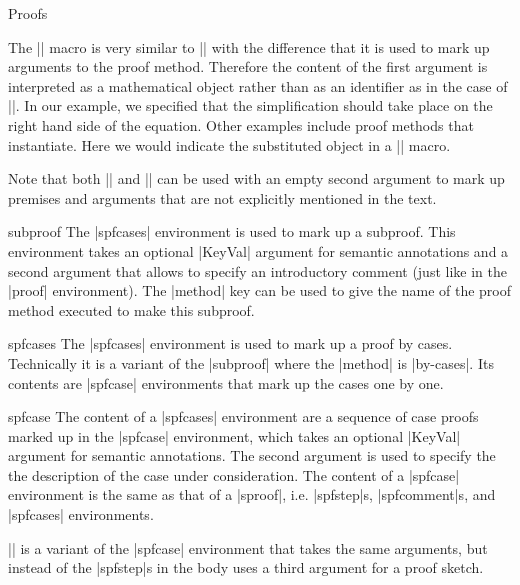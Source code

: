 \begin{sfragment}{Proofs}
\begin{function}{\justarg}
  The |\justarg| macro is very similar to |\premise| with the difference that it is used
  to mark up arguments to the proof method. Therefore the content of the first argument
  is interpreted as a mathematical object rather than as an identifier as in the case of
  |\premise|. In our example, we specified that the simplification should take place on
  the right hand side of the equation. Other examples include proof methods that
  instantiate. Here we would indicate the substituted object in a |\justarg| macro.
\end{function}

Note that both |\premise| and |\justarg| can be used with an empty second argument to
mark up premises and arguments that are not explicitly mentioned in the text.

\begin{environment}{subproof}
  The |spfcases| environment is used to mark up a subproof. This environment takes an
  optional |KeyVal| argument for semantic annotations and a second argument that allows
  to specify an introductory comment (just like in the |proof| environment). The
  |method| key can be used to give the name of the proof method
  executed to make this subproof.
\end{environment}

\begin{environment}{spfcases}
  The |spfcases| environment is used to mark up a proof by cases. Technically it is a
  variant of the |subproof| where the |method| is |by-cases|. Its contents are |spfcase|
  environments that mark up the cases one by one.
\end{environment}

\begin{environment}{spfcase}
  The content of a |spfcases| environment are a sequence of case proofs marked up in the
  |spfcase| environment, which takes an optional |KeyVal| argument for semantic
  annotations. The second argument is used to specify the the description of the case
  under consideration. The content of a |spfcase| environment is the same as that of a
  |sproof|, i.e. |spfstep|s, |spfcomment|s, and |spfcases| environments.
\end{environment}

\begin{function}{\spfcasesketch}
  |\spfcasesketch| is a variant of the |spfcase| environment that takes the same
  arguments, but instead of the |spfstep|s in the body uses a third argument for a proof
  sketch.
\end{function}


\end{sfragment}
